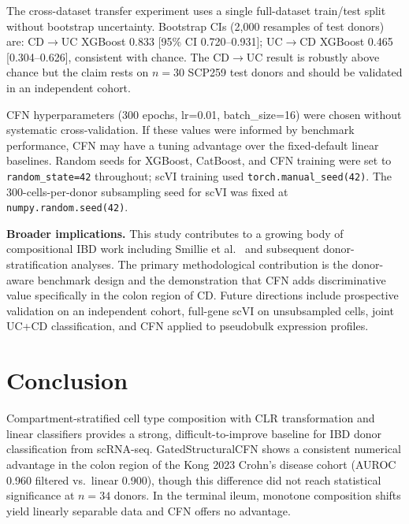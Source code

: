 \documentclass[11pt,letterpaper]{article}
\begin{document}
The cross-dataset transfer experiment uses a single full-dataset train/test split
without bootstrap uncertainty. Bootstrap CIs (2,000 resamples of test donors) are:
CD$\rightarrow$UC XGBoost 0.833 [95\% CI 0.720--0.931]; UC$\rightarrow$CD
XGBoost 0.465 [0.304--0.626], consistent with chance. The CD$\rightarrow$UC result
is robustly above chance but the claim rests on $n=30$ SCP259 test donors and
should be validated in an independent cohort.

CFN hyperparameters (300 epochs, lr=0.01, batch\_size=16) were chosen without
systematic cross-validation. If these values were informed by benchmark
performance, CFN may have a tuning advantage over the fixed-default linear
baselines. Random seeds for XGBoost, CatBoost, and CFN training were set to
\texttt{random\_state=42} throughout; scVI training used \texttt{torch.manual\_seed(42)}.
The 300-cells-per-donor subsampling seed for scVI was fixed at \texttt{numpy.random.seed(42)}.

\textbf{Broader implications.}
This study contributes to a growing body of compositional IBD work including
Smillie et al.\ \citep{smillie2019intra} and subsequent donor-stratification
analyses. The primary methodological contribution is the donor-aware benchmark
design and the demonstration that CFN adds discriminative value specifically in
the colon region of CD. Future directions include prospective validation on
an independent cohort, full-gene scVI on unsub\-sampled cells, joint UC+CD
classification, and CFN applied to pseudobulk expression profiles.

\section{Conclusion}

Compartment-stratified cell type composition with CLR transformation and linear
classifiers provides a strong, difficult-to-improve baseline for IBD donor
classification from scRNA-seq. GatedStructuralCFN shows a consistent numerical advantage in the colon region of the Kong 2023 Crohn's disease cohort
(AUROC 0.960 filtered vs.\ linear 0.900), though this difference did not reach statistical significance at $n=34$ donors. In the terminal ileum, monotone composition
shifts yield linearly separable data and CFN offers no advantage.
\end{document}
